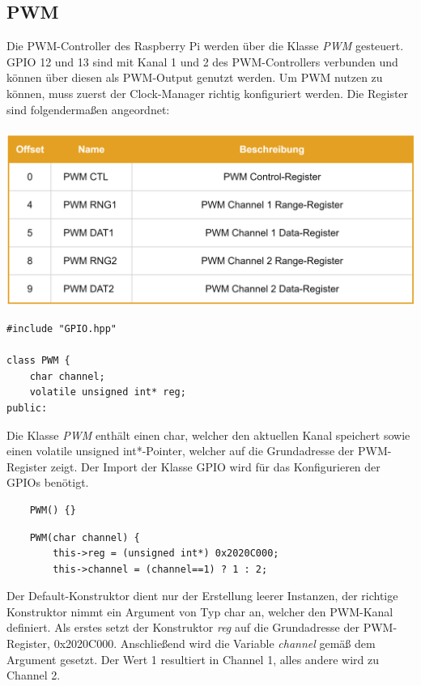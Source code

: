 \documentclass[12pt]{article}
\begin{document}
\subsection{PWM}
Die PWM-Controller des Raspberry Pi werden über die Klasse \textit{PWM} gesteuert. GPIO 12 und 13 sind mit Kanal 1 und 2 des PWM-Controllers verbunden und können über diesen als PWM-Output genutzt werden. Um PWM nutzen zu können, muss zuerst der Clock-Manager richtig konfiguriert werden. Die Register sind folgendermaßen angeordnet:\\\\
\includegraphics[width=\textwidth]{img/pwm_table.png}
\begin{center}\end{center}
\begin{verbatim}
#include "GPIO.hpp"

class PWM {
    char channel;
    volatile unsigned int* reg;
public:
\end{verbatim}
\vspace{-2mm}
Die Klasse \textit{PWM} enthält einen char, welcher den aktuellen Kanal speichert sowie einen volatile unsigned int*-Pointer, welcher auf die Grundadresse der PWM-Register zeigt. Der Import der Klasse GPIO wird für das Konfigurieren der GPIOs benötigt.\\
\begin{verbatim}
    PWM() {}
\end{verbatim}
\begin{verbatim}
    PWM(char channel) {
        this->reg = (unsigned int*) 0x2020C000;
        this->channel = (channel==1) ? 1 : 2;
\end{verbatim}
\vspace{-2mm}
Der Default-Konstruktor dient nur der Erstellung leerer Instanzen, der richtige Konstruktor nimmt ein Argument von Typ char an, welcher den PWM-Kanal definiert. Als erstes setzt der Konstruktor \textit{reg} auf die Grundadresse der PWM-Register, 0x2020C000. Anschließend wird die Variable \textit{channel} gemäß dem Argument gesetzt. Der Wert 1 resultiert in Channel 1, alles andere wird zu Channel 2.\\
\end{document}
